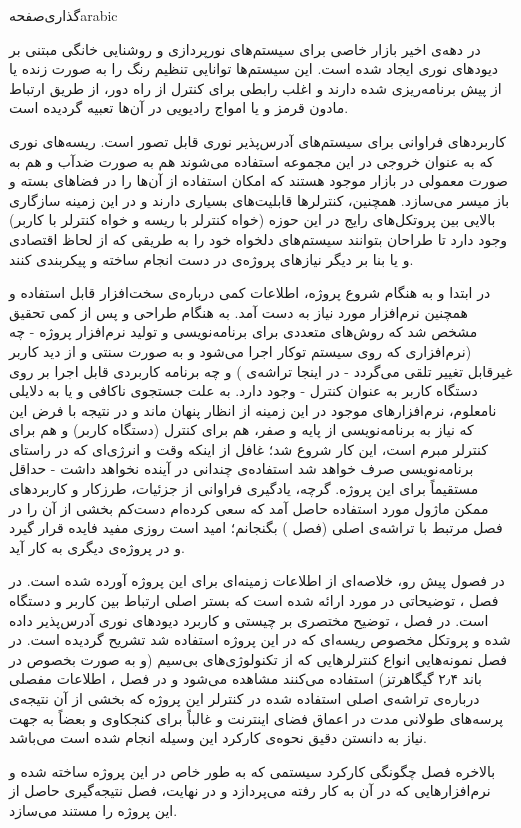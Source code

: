 ‌گذاری‌صفحه{arabic}‬


در دهه‌ی اخیر بازار خاصی برای سیستم‌های نورپردازی و روشنایی خانگی مبتنی بر دیودهای نوری ایجاد شده است. این سیستم‌ها توانایی تنظیم رنگ را به صورت زنده یا از پیش برنامه‌ریزی شده دارند و اغلب رابطی برای کنترل از راه دور، از طریق ارتباط مادون قرمز و یا امواج رادیویی در آن‌ها تعبیه گردیده است.

کاربردهای فراوانی برای سیستم‌های آدرس‌پذیر نوری قابل تصور است. ریسه‌های نوری که به عنوان خروجی در این مجموعه استفاده می‌شوند هم به صورت ضدآب و هم به صورت معمولی در بازار موجود هستند که امکان استفاده از آن‌ها را در فضاهای بسته و باز میسر می‌سازد. همچنین، کنترلرها قابلیت‌های بسیاری دارند و در این زمینه سازگاری بالایی بین پروتکل‌های رایج در این حوزه (خواه کنترلر با ریسه و خواه کنترلر با کاربر) وجود دارد تا طراحان بتوانند سیستم‌های دلخواه خود را به طریقی که از لحاظ اقتصادی و یا بنا بر دیگر نیازهای پروژه‌ی در دست انجام ساخته و پیکربندی کنند.

در ابتدا و به هنگام شروع پروژه، اطلاعات کمی درباره‌ی سخت‌افزار قابل استفاده و همچنین نرم‌افزار مورد نیاز به دست آمد. به هنگام طراحی و پس از کمی تحقیق مشخص شد که روش‌های متعددی برای برنامه‌نویسی و تولید نرم‌افزار پروژه - چه  (نرم‌افزاری که روی سیستم توکار اجرا می‌شود و به صورت سنتی و از دید کاربر غیرقابل تغییر تلقی می‌گردد - در اینجا تراشه‌ی ) و چه برنامه کاربردی قابل اجرا بر روی دستگاه کاربر به عنوان کنترل - وجود دارد. به علت جستجوی ناکافی و یا به دلایلی نامعلوم، نرم‌افزارهای موجود در این زمینه از انظار پنهان ماند و در نتیجه با فرض این که نیاز به برنامه‌نویسی از پایه و صفر، هم برای کنترل (دستگاه کاربر) و هم برای کنترلر مبرم است، این کار شروع شد؛ غافل از اینکه وقت و انرژی‌ای که در راستای برنامه‌نویسی صرف خواهد شد استفاده‌ی چندانی در آینده نخواهد داشت - حداقل مستقیماً برای این پروژه. گرچه، یادگیری فراوانی از جزئیات، طرزکار و کاربردهای ممکن ماژول مورد استفاده حاصل آمد که سعی کرده‌ام دست‌کم بخشی از آن را در فصل مرتبط با تراشه‌ی اصلی (فصل ) بگنجانم؛ امید است روزی مفید فایده قرار گیرد و در پروژه‌ی دیگری به کار آید.

در فصول پیش رو، خلاصه‌ای از اطلاعات زمینه‌ای برای این پروژه آورده شده است. در فصل ، توضیحاتی در مورد  ارائه شده است که بستر اصلی ارتباط بین کاربر و دستگاه است. در فصل ، توضیح مختصری بر چیستی و کاربرد دیودهای نوری آدرس‌پذیر داده شده و پروتکل مخصوص ریسه‌ای که در این پروژه استفاده شد تشریح گردیده است. در فصل  نمونه‌هایی انواع کنترلرهایی که از تکنولوژی‌های بی‌سیم (و به صورت بخصوص در باند ۲٫۴ گیگاهرتز) استفاده می‌کنند مشاهده می‌شود و در فصل ، اطلاعات مفصلی درباره‌ی تراشه‌ی اصلی استفاده شده در کنترلر این پروژه که بخشی از آن نتیجه‌ی پرسه‌های طولانی مدت در اعماق فضای اینترنت و غالباً برای کنجکاوی و بعضاً به جهت نیاز به دانستن دقیق نحوه‌ی کارکرد این وسیله انجام شده است می‌باشد.

بالاخره فصل  چگونگی کارکرد سیستمی که به طور خاص در این پروژه ساخته شده و نرم‌افزارهایی که در آن به کار رفته می‌پردازد و در نهایت، فصل  نتیجه‌گیری حاصل از این پروژه را مستند می‌سازد.

